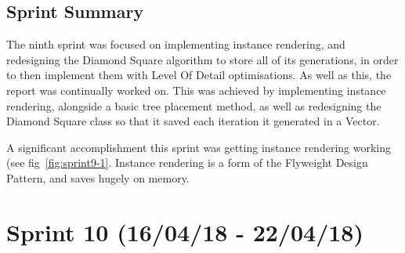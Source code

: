 \documentclass[a4paper,10pt]{report}
\begin{document}
\subsection{Sprint Summary}

The ninth sprint was focused on implementing instance rendering, and redesigning the Diamond Square algorithm to store all of its generations, in order to then implement them with Level Of Detail optimisations. As well as this, the report was continually worked on. This was achieved by implementing instance rendering, alongside a basic tree placement method, as well as redesigning the Diamond Square class so that it saved each iteration it generated in a Vector. \medskip

A significant accomplishment this sprint was getting instance rendering working (see fig~\ref{fig:sprint9-1}. Instance rendering is a form of the Flyweight Design Pattern, and saves hugely on memory.

\clearpage
\section{Sprint 10 (16/04/18 -  22/04/18)}
\end{document}
